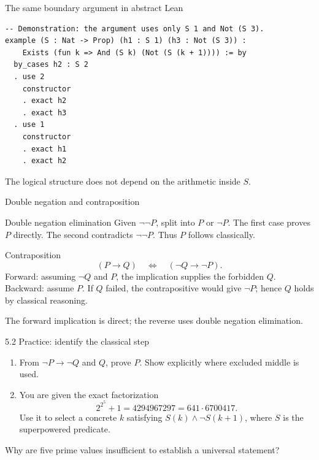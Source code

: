 \begin{frame}[fragile]{The same boundary argument in abstract Lean}
\begin{lstlisting}
-- Demonstration: the argument uses only S 1 and Not (S 3).
example (S : Nat -> Prop) (h1 : S 1) (h3 : Not (S 3)) :
    Exists (fun k => And (S k) (Not (S (k + 1)))) := by
  by_cases h2 : S 2
  . use 2
    constructor
    . exact h2
    . exact h3
  . use 1
    constructor
    . exact h1
    . exact h2
\end{lstlisting}
The logical structure does not depend on the arithmetic inside $S$.
\end{frame}

\begin{frame}{Double negation and contraposition}
\begin{block}{Double negation elimination}
Given $\neg\neg P$, split into $P$ or $\neg P$. The first case proves $P$ directly. The second contradicts $\neg\neg P$. Thus $P$ follows classically.
\end{block}
\begin{block}{Contraposition}
\[
(P\to Q)\quad\Longleftrightarrow\quad(\neg Q\to\neg P).
\]
Forward: assuming $\neg Q$ and $P$, the implication supplies the forbidden $Q$.
Backward: assume $P$. If $Q$ failed, the contrapositive would give $\neg P$; hence $Q$ holds by classical reasoning.
\end{block}
The forward implication is direct; the reverse uses double negation elimination.
\end{frame}

\begin{frame}{5.2 Practice: identify the classical step}
\begin{enumerate}
\item From $\neg P\to\neg Q$ and $Q$, prove $P$. Show explicitly where excluded middle is used.
\item You are given the exact factorization
\[
2^{2^5}+1=4294967297=641\cdot6700417.
\]
Use it to select a concrete $k$ satisfying $S(k)\land\neg S(k+1)$, where $S$ is the superpowered predicate.
\end{enumerate}
Why are five prime values insufficient to establish a universal statement?
\end{frame}

